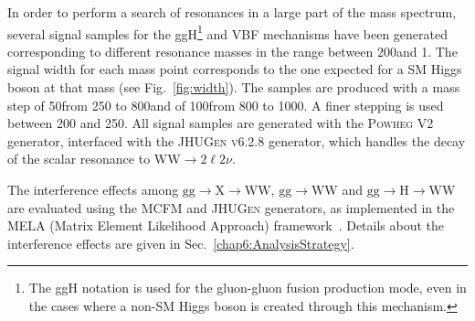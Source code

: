 In order to perform a search of resonances in a large part of the mass spectrum, several signal samples for the ggH\footnote{The ggH notation is used for the gluon-gluon fusion production mode, even in the cases where a non-SM Higgs boson is created through this mechanism.} and VBF mechanisms have been generated corresponding to different resonance masses in the range between 200\GeV and 1\TeV. The signal width for each mass point corresponds to the one expected for a SM Higgs boson at that mass (see Fig.~\ref{fig:width}). The samples are produced with a mass step of 50\GeV from 250 to 800\GeV and of 100\GeV from 800 to 1000\GeV. A finer stepping is used between 200 and 250\GeV. All signal samples are generated with the \textsc{Powheg V2} generator, interfaced with the \textsc{JHUGen v6.2.8} generator, which handles the decay of the scalar resonance to $\mathrm{W W}\to2\ell2\nu$.

The interference effects among $\mathrm{gg\to X \to WW}$, $\mathrm{gg\to WW}$ and $\mathrm{gg\to H \to WW}$ are evaluated using the  \textsc{MCFM} and \textsc{JHUGen} generators, as implemented in the MELA (Matrix Element Likelihood Approach) framework~\cite{JHUGen}. Details about the interference effects are given in Sec.~\ref{chap6:AnalysisStrategy}.
